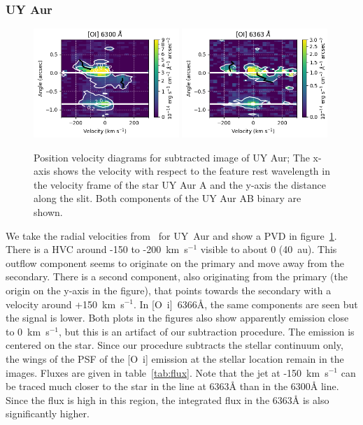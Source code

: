 \documentclass[twocolumn]{aastex62}
\begin{document}
\subsubsection{UY Aur}
\begin{figure}[h!]
\begin{center}
\includegraphics[width=0.49\textwidth]{UY_Aur_6300.png}
\includegraphics[width=0.49\textwidth]{UY_Aur_6363.png}
\caption{Position velocity diagrams for subtracted
image of UY Aur; The x-axis shows the velocity with respect to the
feature rest wavelength in the velocity frame of the star UY Aur
A and the y-axis the distance along the slit. Both components of the UY Aur AB binary are shown.
\label{fig:UYAur}
}
\end{center}
\end{figure}
We take the radial velocities from~\citet{2012ApJ...745..119N} for UY~Aur and
show a PVD in figure~\ref{fig:UYAur}. There is a HVC around -150 to
-200~km~s$^{-1}$ visible to about 0 (40~au). This outflow component
seems to originate on the primary and move away from the secondary. There is a
second component, also originating from the primary (the origin on the y-axis in
the figure), that points towards the secondary with a velocity around
+150~km~s$^{-1}$. In [O~{\sc i}]~6366\AA{}, the same components are seen but
the signal is lower. Both plots in the figures also show apparently emission close to
0~km~s$^{-1}$, but this is an artifact of our subtraction procedure. The
emission is centered on the star. Since our procedure subtracts the stellar
continuum only, the wings of the PSF of the [O~{\sc i}] emission at the stellar
location remain in the images. Fluxes are given in table~\ref{tab:flux}. Note
that the jet at -150~km~s$^{-1}$ can be traced much closer to the star in the
line at 6363\AA{} than in the 6300\AA{} line. Since the flux is high in this
region, the integrated flux in the 6363\AA{} is also significantly higher.
\end{document}
